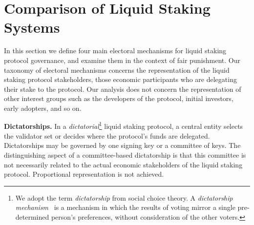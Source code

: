 \section{Comparison of Liquid Staking Systems}



In this section we define four main electoral mechanisms for liquid staking
protocol governance, and examine them in the context of fair punishment.
Our taxonomy of electoral mechanisms concerns the representation of the liquid
staking protocol stakeholders, those economic participants who are delegating
their stake to the protocol. Our analysis does not concern the representation of
other interest groups such as the developers of the protocol, initial investors,
early adopters, and so on.

\noindent
\textbf{Dictatorships.}
In a \emph{dictatorial}\footnote{We adopt the term \emph{dictatorship} from
social choice theory. A \emph{dictatorship mechanism}~\cite{arrow} is a mechanism in which
the results of voting mirror a single pre-determined person's preferences, without
consideration of the other voters.}
liquid staking protocol, a central entity
selects the validator set or decides where the protocol's funds
are delegated.
Dictatorships may be governed by one signing key or a
committee of keys. The distinguishing aspect of a committee-based dictatorship
is that this committee is not necessarily related to the actual economic stakeholders
of the liquid staking protocol.
Proportional representation is not
achieved.


